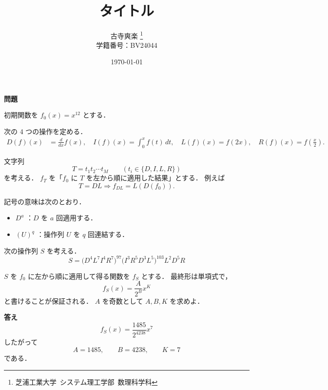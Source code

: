 \documentclass[uplatex,dvipdfmx,11pt]{jsarticle}
\title{タイトル}  %
\author{古寺爽楽  \thanks{芝浦工業大学\ システム理工学部\ 数理科学科}\\ {学籍番号：BV24044}}  %
\date{\today}  %
\theoremstyle{definition}   %
\begin{document}
\noindent
\textbf{問題}

\medskip
初期関数を $f_0(x)=x^{12}$ とする．

\medskip
次の 4 つの操作を定める．
\begin{equation*}
\begin{aligned}
D(f)(x)&=\frac{d}{dx}f(x),\quad
I(f)(x)=\int_0^x f(t)\,dt,\quad
L(f)(x)=f(2x),\quad
R(f)(x)=f\!\left(\frac{x}{2}\right).
\end{aligned}
\end{equation*}

\medskip
文字列
\begin{equation*}
T=t_1t_2\cdots t_M \qquad (t_i\in\{D,I,L,R\})
\end{equation*}
を考える．
$f_T$ を「$f_0$ に $T$ を左から順に適用した結果」とする．
例えば
\begin{equation*}
T=DL \Longrightarrow f_{DL}=L(D(f_0)).
\end{equation*}

\medskip
記号の意味は次のとおり．
\begin{itemize}
  \item $D^a$ ：$D$ を $a$ 回適用する．
  \item $(U)^q$ ：操作列 $U$ を $q$ 回連結する．
\end{itemize}

\medskip
次の操作列 $S$ を考える．
\begin{equation*}
S=
\bigl(D^4L^7I^4R^7\bigr)^{97}
\bigl(I^3R^5D^3L^5\bigr)^{103}
L^2D^5R
\end{equation*}

$S$ を $f_0$ に左から順に適用して得る関数を $f_S$ とする．
最終形は単項式で，
\begin{equation*}
f_S(x)=\frac{A}{2^B}x^K
\end{equation*}
と書けることが保証される．
$A$ を奇数として $A,B,K$ を求めよ．

\medskip
\textbf{答え}
\begin{equation*}
f_S(x)=\frac{1485}{2^{4238}}x^7
\end{equation*}
したがって
\begin{equation*}
A=1485,\qquad B=4238,\qquad K=7
\end{equation*}
である．
\end{document}
